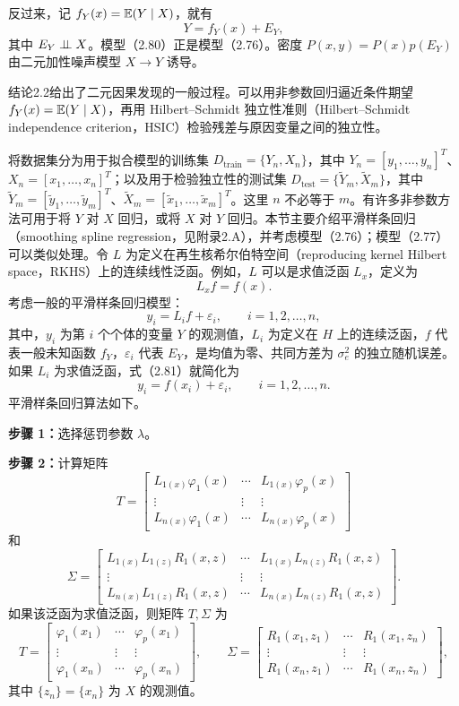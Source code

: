 反过来，记 $f_Y(x)=\mathbb{E}(Y\mid X)$，就有
\begin{equation}
Y=f_Y(x)+E_Y,
\tag{2.80}
\end{equation}
其中 $E_Y\mathrel{\perp\!\!\!\perp} X$。模型（2.80）正是模型（2.76）。密度 $P(x,y)=P(x)p(E_Y)$ 由二元加性噪声模型 $X\to Y$ 诱导。

结论2.2给出了二元因果发现的一般过程。可以用非参数回归逼近条件期望 $f_Y(x)=\mathbb{E}(Y\mid X)$，再用 Hilbert--Schmidt 独立性准则（Hilbert--Schmidt independence criterion，HSIC）检验残差与原因变量之间的独立性。

将数据集分为用于拟合模型的训练集 $D_{\mathrm{train}}=\{Y_n,X_n\}$，其中 $Y_n=[y_1,\ldots,y_n]^T$、$X_n=[x_1,\ldots,x_n]^T$；以及用于检验独立性的测试集 $D_{\mathrm{test}}=\{\widetilde Y_m,\widetilde X_m\}$，其中 $\widetilde Y_m=[\widetilde y_1,\ldots,\widetilde y_m]^T$、$\widetilde X_m=[\widetilde x_1,\ldots,\widetilde x_m]^T$。这里 $n$ 不必等于 $m$。有许多非参数方法可用于将 $Y$ 对 $X$ 回归，或将 $X$ 对 $Y$ 回归。本节主要介绍平滑样条回归（smoothing spline regression，见附录2.A），并考虑模型（2.76）；模型（2.77）可以类似处理。令 $L$ 为定义在再生核希尔伯特空间（reproducing kernel Hilbert space，RKHS）上的连续线性泛函。例如，$L$ 可以是求值泛函 $L_x$，定义为
\[
L_xf=f(x).
\]
考虑一般的平滑样条回归模型：
\begin{equation}
y_i=L_if+\varepsilon_i,\qquad i=1,2,\ldots,n,
\tag{2.81}
\end{equation}
其中，$y_i$ 为第 $i$ 个个体的变量 $Y$ 的观测值，$L_i$ 为定义在 $H$ 上的连续泛函，$f$ 代表一般未知函数 $f_Y$，$\varepsilon_i$ 代表 $E_Y$，是均值为零、共同方差为 $\sigma_e^2$ 的独立随机误差。如果 $L_i$ 为求值泛函，式（2.81）就简化为
\[
y_i=f(x_i)+\varepsilon_i,\qquad i=1,2,\ldots,n.
\]
平滑样条回归算法如下。

\noindent\textbf{步骤 1：}选择惩罚参数 $\lambda$。

\noindent\textbf{步骤 2：}计算矩阵
\[
T=\begin{bmatrix}
L_{1(x)}\varphi_1(x)&\cdots&L_{1(x)}\varphi_p(x)\\
\vdots&\vdots&\vdots\\
L_{n(x)}\varphi_1(x)&\cdots&L_{n(x)}\varphi_p(x)
\end{bmatrix}
\]
和
\[
\Sigma=\begin{bmatrix}
L_{1(x)}L_{1(z)}R_1(x,z)&\cdots&L_{1(x)}L_{n(z)}R_1(x,z)\\
\vdots&\vdots&\vdots\\
L_{n(x)}L_{1(z)}R_1(x,z)&\cdots&L_{n(x)}L_{n(z)}R_1(x,z)
\end{bmatrix}.
\]
如果该泛函为求值泛函，则矩阵 $T,\Sigma$ 为
\[
T=\begin{bmatrix}
\varphi_1(x_1)&\cdots&\varphi_p(x_1)\\\vdots&\vdots&\vdots\\
\varphi_1(x_n)&\cdots&\varphi_p(x_n)
\end{bmatrix},
\qquad
\Sigma=\begin{bmatrix}
R_1(x_1,z_1)&\cdots&R_1(x_1,z_n)\\\vdots&\vdots&\vdots\\
R_1(x_n,z_1)&\cdots&R_1(x_n,z_n)
\end{bmatrix},
\]
其中 $\{z_n\}=\{x_n\}$ 为 $X$ 的观测值。

